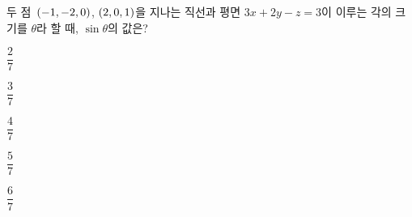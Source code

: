 두 점~$(-1{,}\mkern3mu\mathopen{}-2{,}\mkern3mu\mathopen{}0)$, $(2{,}\mkern3mu\mathopen{}0{,}\mkern3mu\mathopen{}1)$을 지나는 직선과 평면 $3x+2y-z=3$이 이루는 각의 크기를 $\theta$라 할 때, $\sin\theta$의 값은?
\begin{choices32}{\rule[-3ex]{0pt}{8ex}$\dfrac{2}{7}$}{\rule[-3ex]{0pt}{8ex}$\dfrac{3}{7}$}{\rule[-3ex]{0pt}{8ex}$\dfrac{4}{7}$}{\rule[-3ex]{0pt}{8ex}$\dfrac{5}{7}$}{\rule[-3ex]{0pt}{8ex}$\dfrac{6}{7}$}\end{choices32}
